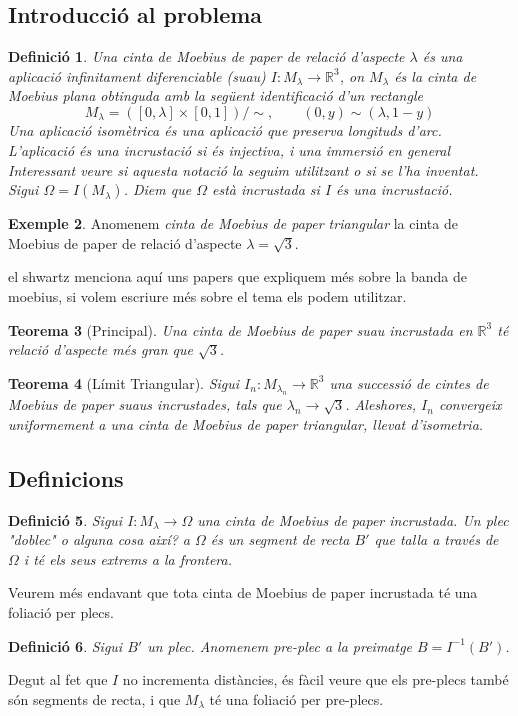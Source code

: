 \documentclass[11pt,a4paper,openright,oneside]{book}
\numberwithin{equation}{section}
\newtheorem{teo}{Teorema}[section]
\newtheorem{defi}[teo]{Definici\'o}
\theoremstyle{definition}
\newtheorem{ex}[teo]{Exemple}
\begin{document}
\subsection{Introducció al problema}
\begin{defi}
    Una {\normalfont cinta de Moebius de paper de relació d'aspecte $\lambda$} és una aplicació infinitament diferenciable (suau) $I:M_{\lambda}\to\mathbb R^3$, on $M_\lambda$ és la cinta de Moebius plana obtinguda amb la següent identificació d'un rectangle
    $$M_\lambda = ([0,\lambda] \times [0,1])/\sim, \quad\quad (0,y)\sim(\lambda,1-y)$$
Una {\normalfont aplicació isomètrica} és una aplicació que preserva longituds d'arc. L'aplicació és una {\normalfont incrustació} si és injectiva, i una {\normalfont immersió} en general {\color{blue} Interessant veure si aquesta notació la seguim utilitzant o si se l'ha inventat}. Sigui $\Omega=I(M_\lambda)$. Diem que $\Omega$ està {\normalfont incrustada} si $I$ és una incrustació. 
\end{defi}
\begin{ex}
    Anomenem \textit{cinta de Moebius de paper triangular} la cinta de Moebius de paper de relació d'aspecte $\lambda = \sqrt{3}$.
\end{ex}
{\color{blue} el shwartz menciona aquí uns papers que expliquem més sobre la banda de moebius, si volem escriure més sobre el tema els podem utilitzar.}

\begin{teo}[Principal]\label{teo:Main Schwartz}
    Una cinta de Moebius de paper suau incrustada en $\mathbb R^3$ té relació d'aspecte més gran que $\sqrt{3}$.
\end{teo}

\begin{teo}[Límit Triangular]\label{teo:Límit triangular}
    Sigui $I_n:M_{\lambda_n}\to\mathbb R^3$ una successió de cintes de Moebius de paper suaus incrustades, tals que $\lambda_n\to\sqrt{3}$. Aleshores, $I_n$ convergeix uniformement a una cinta de Moebius de paper triangular, llevat d'isometria.
\end{teo}
\subsection{Definicions}
\begin{defi}
    Sigui $I:M_\lambda\to\Omega$ una cinta de Moebius de paper incrustada. Un {\normalfont plec} {\color{blue} "doblec" o alguna cosa així?} a $\Omega$ és un segment de recta $B'$ que talla a través de $\Omega$ i té els seus extrems a la frontera.
\end{defi}
Veurem més endavant que tota cinta de Moebius de paper incrustada té una foliació per plecs.
\begin{defi}
    Sigui $B'$ un plec. Anomenem {\normalfont pre-plec} a la preimatge $B=I^{-1}(B')$.
\end{defi}
Degut al fet que $I$ no incrementa distàncies, és fàcil veure que els pre-plecs també són segments de recta, i que $M_\lambda$ té una foliació per pre-plecs.
\end{document}
